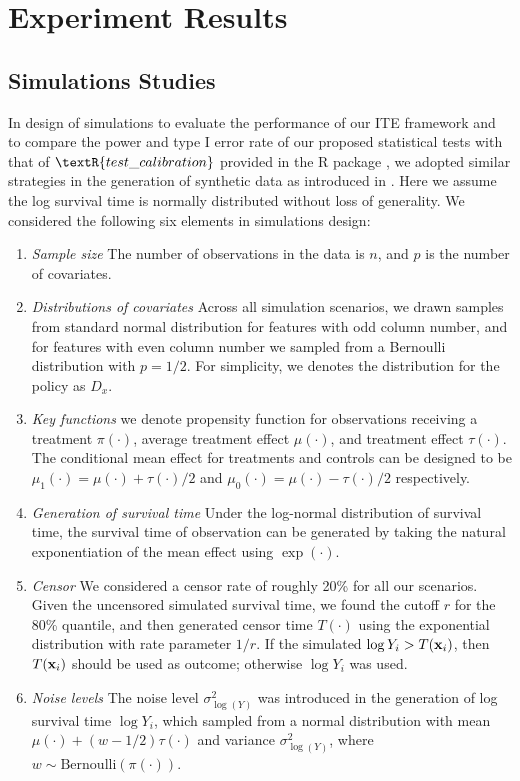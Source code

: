 \section{Experiment Results}
\label{sec:ite_res}

  \subsection{Simulations Studies}
    In design of simulations to evaluate the performance of our ITE framework and to compare the power and type I error rate of our proposed statistical tests with that of $\textR{test\_calibration}$ provided in the R package , we adopted similar strategies in the generation of synthetic data as introduced in \cite{powers2017some}. Here we assume the log survival time is normally distributed without loss of generality. We considered the following six elements in simulations design:
    \begin{enumerate}
      \item \textit{Sample size} The number of observations in the data is $n$, and $p$ is the number of covariates.
      \item \textit{Distributions of covariates} Across all simulation scenarios, we drawn samples from standard normal distribution for features with odd column number, and for features with even column number we sampled from a Bernoulli distribution with $p = 1/2$. For simplicity, we denotes the distribution for the policy as $D_x$.
      \item \textit{Key functions} we denote propensity function for observations receiving a treatment $\pi(\cdot)$, average treatment effect $\mu(\cdot)$, and treatment effect $\tau(\cdot)$. The conditional mean effect for treatments and controls can be designed to be $\mu_1(\cdot) = \mu(\cdot) + \tau(\cdot)/2 $ and $\mu_0(\cdot) = \mu(\cdot) - \tau(\cdot)/2 $ respectively.
      \item \textit{Generation of survival time} Under the log-normal distribution of survival time, the survival time of observation can be generated by taking the natural exponentiation of the mean effect using $\exp(\cdot)$.
      \item \textit{Censor} We considered a censor rate of roughly 20\% for all our scenarios. Given the uncensored simulated survival time, we found the cutoff $r$ for the 80\% quantile, and then generated censor time $T(\cdot)$ using the exponential distribution with rate parameter $1/r$. If the simulated $\log Y_i > T(\mathbf{x}_i)$, then $T(\mathbf{x}_i)$ should be used as outcome; otherwise $\log Y_i$ was used.
      \item \textit{Noise levels} The noise level $\sigma_{\log(Y)}^2$ was introduced in the generation of log survival time $\log Y_i$, which sampled from a normal distribution with mean $\mu(\cdot) + (w - 1/2) \tau(\cdot)$ and variance $\sigma_{\log(Y)}^2$, where $w \sim \mathrm{Bernoulli}(\pi(\cdot))$. 
    \end{enumerate}  
